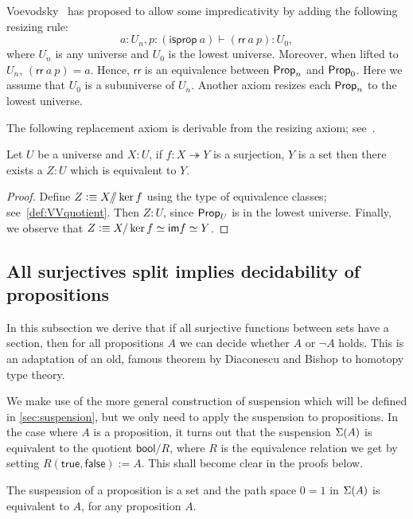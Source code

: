 Voevodsky~\cite{Universe-poly} has proposed to allow some impredicativity by adding the following resizing rule:
\[a:U_n, p:(\mathsf{isprop}\ a)\vdash (\mathsf{rr}\ a\ p): U_0,\]
where $U_n$ is any universe and $U_0$ is the lowest universe.
Moreover, when lifted to $U_n$, $(\mathsf{rr}\ a\ p)= a$.
Hence, $\mathsf{rr}$ is an equivalence between $\mathsf{Prop}_n$ and $\mathsf{Prop}_0$. 
Here we assume that $U_0$ is a subuniverse of $U_n$. 
Another axiom resizes each $\mathsf{Prop}_n$ to the lowest universe.

The following replacement axiom is derivable from the resizing axiom; see~\cite{Universe-poly}.
\begin{lem}\label{lem:replacement}
Let $U$ be a universe and $X:U$, if $f:X\twoheadrightarrow Y$ is a surjection, $Y$ is a set then there exists a $Z:U$ which is
equivalent to $Y$.
\end{lem}
\begin{proof}
Define $Z\vcentcolon\equiv X/\!\!/\ker f$ using the type of equivalence classes; see~\ref{def:VVquotient}. 
Then $Z:U$, since $\mathsf{Prop}_U$ is in the lowest universe. Finally, we observe that $Z\vcentcolon\equiv X/\ker f\simeq\mathsf{im} f\simeq Y$.
\end{proof}

\subsection{All surjectives split implies decidability of propositions}\label{sec:surj_split}
In this subsection we derive that if all surjective functions between sets have
a section, then for all propositions $A$ we can decide whether $A$ or $\neg A$
holds. This is an adaptation of an old, famous theorem by
Diaconescu and Bishop to homotopy type theory. %

We make use of the more general construction of suspension which will be defined in \autoref{sec:suspension}, but we only need
to apply the suspension to propositions. In the case where $A$ is a proposition,
it turns out that the
suspension $\Sigma(A)$ is equivalent to the quotient $\mathsf{bool}/R$,
where $R$ is the equivalence relation we get by setting
$R(\mathsf{true},\mathsf{false}):= A$. This shall become clear in the proofs
below.

\begin{lem}\label{prop:trunc_of_prop_is_set}
The suspension of a proposition is a set and the path space 
$0=1$ in $\Sigma(A)$ is equivalent to $A$, for any proposition $A$. 
\end{lem}

